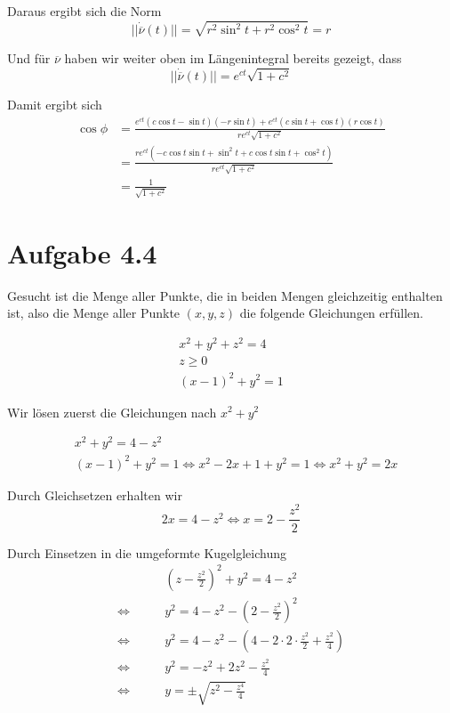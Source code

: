 \documentclass[a4paper,german,12pt,smallheadings]{scrartcl}
\begin{document}
\begin{enumerate}[(1)]
    Daraus ergibt sich die Norm
    \begin{equation*}
      ||\dot{\overline{\nu}}(t)|| = \sqrt{r^2 \sin^2 t + r^2 \cos^2 t} = r
    \end{equation*}

    Und für $\overline{\nu}$ haben wir weiter oben im Längenintegral bereits gezeigt, dass
    \begin{equation*}
      ||\dot{\overline{\nu}}(t)|| = e^{ct} \sqrt{1+c^2}
    \end{equation*}

    Damit ergibt sich
    \begin{align*}
      \cos \phi &= \frac{e^{ct} (c \cos t - \sin t)(-r \sin t) + e^{ct} (c \sin t + \cos t)(r \cos t)}{re^{ct}\sqrt{1+c^2}} \\
                &= \frac{re^{ct} (-c\cos t \sin t + \sin^2 t + c \cos t \sin t + \cos^2 t)}{re^{ct} \sqrt{1+c^2}} \\
                &= \frac{1}{\sqrt{1+c^2}}
    \end{align*}
\end{enumerate}

\section*{Aufgabe 4.4}
Gesucht ist die Menge aller Punkte, die in beiden Mengen gleichzeitig enthalten
ist, also die Menge aller Punkte $(x,y,z)$ die folgende Gleichungen erfüllen.

\begin{align*}
  x^2+y^2+z^2 = 4 \\
  z \ge 0 \\
  (x-1)^2 + y^2 = 1
\end{align*}

Wir lösen zuerst die Gleichungen nach $x^2+y^2$

\begin{align*}
  &x^2 + y^2 = 4 - z^2 \\
  &(x-1)^2 + y^2 = 1 \Leftrightarrow x^2 - 2x + 1 + y^2 = 1 \Leftrightarrow x^2+y^2 = 2x
\end{align*}

Durch Gleichsetzen erhalten wir
\begin{equation*}
  2x = 4 - z^2 \Leftrightarrow x = 2 - \frac{z^2}{2}
\end{equation*}

Durch Einsetzen in die umgeformte Kugelgleichung
\begin{align*}
  &\left(z - \frac{z^2}{2}\right)^2 + y^2 = 4 - z^2 \\
  \Leftrightarrow\qquad &y^2 = 4 - z^2 - \left(2 - \frac{z^2}{2}\right)^2 \\
  \Leftrightarrow\qquad &y^2 = 4 - z^2 - \left(4 - 2\cdot2\cdot\frac{z^2}{2} + \frac{z^2}{4}\right) \\
  \Leftrightarrow\qquad &y^2 = - z^2 + 2z^2 - \frac{z^2}{4} \\
  \Leftrightarrow\qquad &y = \pm \sqrt{z^2 - \frac{z^4}{4}} \\
\end{align*}
\end{document}
